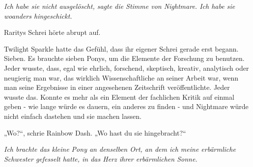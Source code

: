 \emph{\emph{Ich habe sie nicht ausgelöscht}, sagte die Stimme von Nightmare. \emph{Ich habe sie woanders hingeschickt.}}

Raritys Schrei hörte abrupt auf.

Twilight Sparkle hatte das Gefühl, dass ihr eigener Schrei gerade erst begann. Sieben. Es brauchte sieben Ponys, um die Elemente der Forschung zu benutzen. Jeder wusste, dass, egal wie ehrlich, forschend, skeptisch, kreativ, analytisch oder neugierig man war, das wirklich Wissenschaftliche an seiner Arbeit war, wenn man seine Ergebnisse in einer angesehenen Zeitschrift veröffentlichte. Jeder wusste das. Konnte es mehr als ein Element der fachlichen Kritik auf einmal geben - wie lange würde es dauern, ein anderes zu finden - und Nightmare würde nicht einfach dastehen und sie machen lassen.

„Wo?“, schrie Rainbow Dash. „Wo hast du sie hingebracht?“

\emph{Ich brachte das kleine Pony an denselben Ort, an dem ich meine erbärmliche Schwester gefesselt hatte, in das Herz ihrer erbärmlichen Sonne.}

